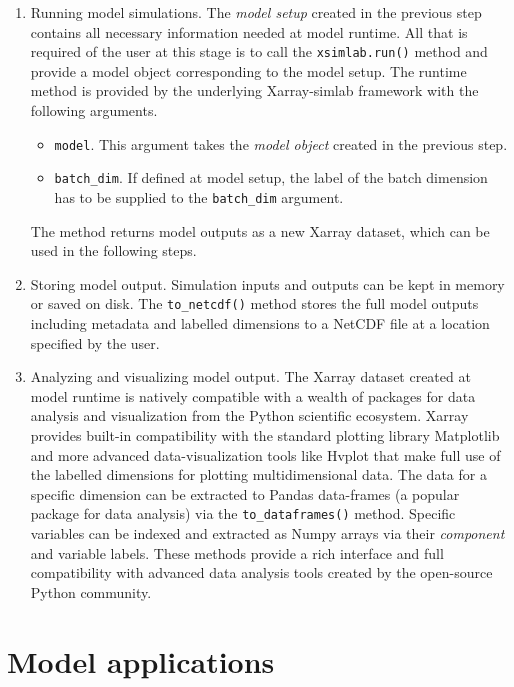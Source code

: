 \documentclass[journal abbreviation, manuscript]{copernicus}
\begin{document}
\begin{enumerate}
    \item Running model simulations. The \textit{model setup} created in the previous step contains all necessary information needed at model runtime. All that is required of the user at this stage is to call the \texttt{xsimlab.run()} method and provide a model object corresponding to the model setup. The runtime method is provided by the underlying Xarray-simlab framework with the following arguments.
    \begin{itemize}
        \item \texttt{model}. This argument takes the \textit{model object} created in the previous step.
        \item \texttt{batch\_dim}. If defined at model setup, the label of the batch dimension has to be supplied to the \texttt{batch\_dim} argument.
    \end{itemize}
    The method returns model outputs as a new Xarray dataset, which can be used in the following steps.
    
    \item Storing model output. Simulation inputs and outputs can be kept in memory or saved on disk. The \texttt{to\_netcdf()} method stores the full model outputs including metadata and labelled dimensions to a NetCDF file at a location specified by the user.
    
    \item Analyzing and visualizing model output. The Xarray dataset created at model runtime is natively compatible with a wealth of packages for data analysis and visualization from the Python scientific ecosystem. Xarray provides built-in compatibility with the standard plotting library Matplotlib and more advanced data-visualization tools like Hvplot that make full use of the labelled dimensions for plotting multidimensional data. The data for a specific dimension can be extracted to Pandas data-frames (a popular package for data analysis) via the \texttt{to\_dataframes()} method. Specific variables can be indexed and extracted as Numpy arrays via their \textit{component} and variable labels. These methods provide a rich interface and full compatibility with advanced data analysis tools created by the open-source Python community.

\end{enumerate}


\section{Model applications} \label{Section:UseCases}
\end{document}
